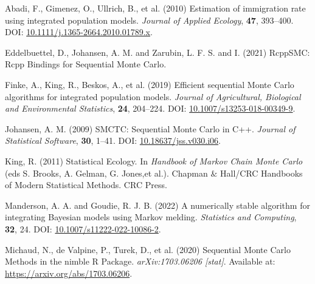 \documentclass[
  10pt,
  a4paper,
]{article}
\newlength{\cslhangindent}
\newlength{\cslentryspacingunit} %
\newenvironment{CSLReferences}[2] %
 {%
  \setlength{\parindent}{0pt}
  \ifodd #1
  \let\oldpar\par
  \def\par{\hangindent=\cslhangindent\oldpar}
  \fi
  \setlength{\parskip}{#2\cslentryspacingunit}
 }%
 {}
\begin{document}
\hypertarget{refs}{}
\begin{CSLReferences}{1}{0}
\leavevmode{}%
Abadi, F., Gimenez, O., Ullrich, B., et al. (2010) Estimation of
immigration rate using integrated population models. \emph{Journal of
Applied Ecology}, \textbf{47}, 393--400. DOI:
\href{https://doi.org/10.1111/j.1365-2664.2010.01789.x}{10.1111/j.1365-2664.2010.01789.x}.

\leavevmode{}%
Eddelbuettel, D., Johansen, A. M. and Zarubin, L. F. S. and I. (2021)
{RcppSMC}: {Rcpp Bindings} for {Sequential Monte Carlo}.

\leavevmode{}%
Finke, A., King, R., Beskos, A., et al. (2019) Efficient sequential
{Monte Carlo} algorithms for integrated population models. \emph{Journal
of Agricultural, Biological and Environmental Statistics}, \textbf{24},
204--224. DOI:
\href{https://doi.org/10.1007/s13253-018-00349-9}{10.1007/s13253-018-00349-9}.

\leavevmode{}%
Johansen, A. M. (2009) {SMCTC}: {Sequential Monte Carlo} in {C}++.
\emph{Journal of Statistical Software}, \textbf{30}, 1--41. DOI:
\href{https://doi.org/10.18637/jss.v030.i06}{10.18637/jss.v030.i06}.

\leavevmode{}%
King, R. (2011) Statistical {Ecology}. In \emph{Handbook of {Markov
Chain Monte Carlo}} (eds S. Brooks, A. Gelman, G. Jones,et al.). Chapman
{\(\&\)} {Hall}/{CRC Handbooks} of {Modern Statistical Methods}. {CRC
Press}.

\leavevmode{}%
Manderson, A. A. and Goudie, R. J. B. (2022) A numerically stable
algorithm for integrating {Bayesian} models using {Markov} melding.
\emph{Statistics and Computing}, \textbf{32}, 24. DOI:
\href{https://doi.org/10.1007/s11222-022-10086-2}{10.1007/s11222-022-10086-2}.

\leavevmode{}%
Michaud, N., de Valpine, P., Turek, D., et al. (2020) Sequential {Monte
Carlo Methods} in the nimble {R Package}. \emph{arXiv:1703.06206
{[}stat{]}}. Available at: \url{https://arxiv.org/abs/1703.06206}.

\end{CSLReferences}
\end{document}
